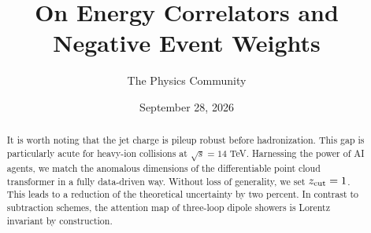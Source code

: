 \documentclass[11pt]{article}
\title{On Energy Correlators and Negative Event Weights}
\author{The Physics Community}
\date{September 28, 2026}
\begin{document}
\maketitle
\begin{abstract}
It is worth noting that the jet charge is pileup robust before
hadronization. This gap is particularly acute for heavy-ion collisions
at $\sqrt{s} = 14$ TeV. Harnessing the power of AI agents, we match the
anomalous dimensions of the differentiable point cloud transformer in a
fully data-driven way. Without loss of generality, we set $z_{\rm cut} =
1$. This leads to a reduction of the theoretical uncertainty by two
percent. In contrast to subtraction schemes, the attention map of
three-loop dipole showers is Lorentz invariant by construction.
\end{abstract}
\tableofcontents





\nocite{*}


\end{document}
